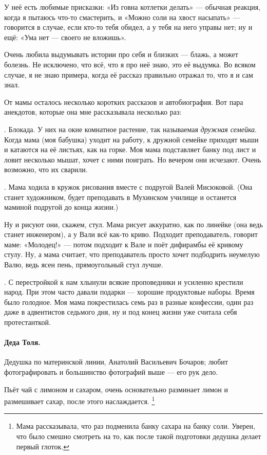 \documentclass{book}
\begin{document}
У неё есть любимые присказки: «Из говна котлетки делать» --- обычная реакция, когда я пытаюсь что-то смастерить, и «Можно соли на хвост насыпать» --- говорится в случае, если кто-то тебя обидел, а у тебя на него управы нет;
ну и ещё: «Ума нет --- своего не вложишь».

Очень любила выдумывать истории про себя и близких --- блажь, а может болезнь.
Не исключено, что всё, что я про неё знаю, это её выдумка.
Во всяком случае, я не знаю примера, когда её рассказ правильно отражал то, что я и сам знал.

От мамы осталось несколько коротких рассказов и автобиография.
Вот пара анекдотов, которые она мне рассказывала несколько раз:

.
Блокада. 
У них на окне комнатное растение, так называемая \textit{дружная семейка}.
Когда мама (моя бабушка) уходит на работу, к дружной семейке приходят мыши и катаются на её листьях, как на горке.
Моя мама подставляет банку под лист и ловит несколько мышат, хочет с ними поиграть.
Но вечером они исчезают.
Очень возможно, что их сварили.

.
Мама ходила в кружок рисования вместе с подругой Валей Мисюковой.
(Она станет художником, будет преподавать в Мухинском училище и останется маминой подругой до конца жизни.)

Ну и рисуют они, скажем, стул.
Мама рисует аккуратно, как по линейке (она ведь станет инженером), а у Вали всё как-то криво.
Подходит преподаватель, говорит маме: «Молодец!» ---
потом подходит к Вале и поёт дифирамбы её кривому стулу.
Ну, а мама считает, что преподаватель просто хочет подбодрить неумелую Валю, ведь ясен пень, прямоугольный стул лучше.

.
С перестройкой к нам хлынули всякие проповедники и усиленно крестили народ.
При этом часто давали подарки --- хорошие продуктовые наборы.
Время было голодное.
Моя мама покрестилась семь раз в разные конфессии, один раз даже в адвентистов седьмого дня,
ну и под конец жизни уже считала себя протестанткой.

\paragraph{Деда Толя.}
Дедушка по материнской линии,
Анатолий Васильевич Бочаров; любит фотографировать и большинство фотографий выше --- его рук дело.

Пьёт чай с лимоном и сахаром, очень основательно разминает лимон и размешивает сахар, после этого наслаждается.%
\footnote{Мама рассказывала, что раз подменила банку сахара на банку соли.
Уверен, что было смешно смотреть на то, как после такой подготовки дедушка делает первый глоток.}
\end{document}
